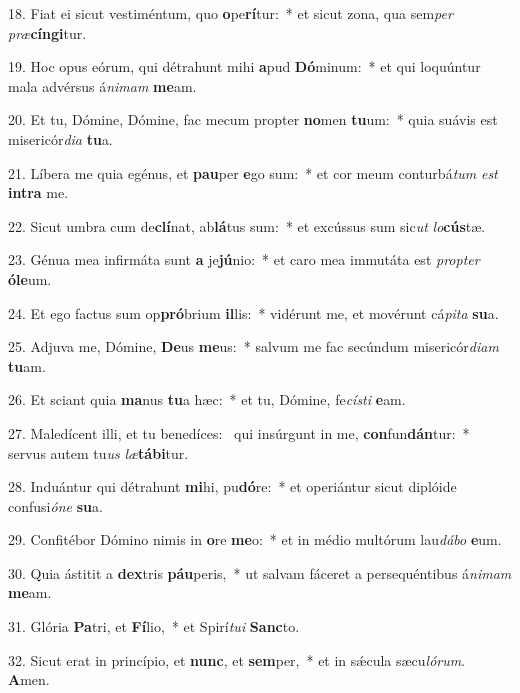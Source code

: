 18. Fiat ei sicut vestiméntum, quo \textbf{o}pe\textbf{rí}tur:~*  et sicut zona, qua sem\textit{per} \textit{præ}\textbf{cín}\textbf{gi}tur.\

19. Hoc opus eórum, qui détrahunt mihi \textbf{a}pud \textbf{Dó}minum:~*  et qui loquúntur mala advérsus á\textit{ni}\textit{mam} \textbf{me}am.\

20. Et tu, Dómine, Dómine, fac mecum propter \textbf{no}men \textbf{tu}um:~*  quia suávis est misericór\textit{di}\textit{a} \textbf{tu}a.\

21. Líbera me quia egénus, et \textbf{pau}per \textbf{e}go sum:~*  et cor meum conturbá\textit{tum} \textit{est} \textbf{in}\textbf{tra} me.\

22. Sicut umbra cum de\textbf{clí}nat, ab\textbf{lá}tus sum:~*  et excússus sum sic\textit{ut} \textit{lo}\textbf{cús}tæ.\

23. Génua mea infirmáta sunt \textbf{a} je\textbf{jú}nio:~*  et caro mea immutáta est \textit{prop}\textit{ter} \textbf{ó}\textbf{le}um.\

24. Et ego factus sum op\textbf{pró}brium \textbf{il}lis:~*  vidérunt me, et movérunt cá\textit{pi}\textit{ta} \textbf{su}a.\

25. Adjuva me, Dómine, \textbf{De}us \textbf{me}us:~*  salvum me fac secúndum misericór\textit{di}\textit{am} \textbf{tu}am.\

26. Et sciant quia \textbf{ma}nus \textbf{tu}a hæc:~*  et tu, Dómine, fe\textit{cís}\textit{ti} \textbf{e}am.\

27. Maledícent illi, et tu benedíces: \dag\  qui insúrgunt in me, \textbf{con}fun\textbf{dán}tur:~*  servus autem tu\textit{us} \textit{læ}\textbf{tá}\textbf{bi}tur.\

28. Induántur qui détrahunt \textbf{mi}hi, pu\textbf{dó}re:~*  et operiántur sicut diplóide confusi\textit{ó}\textit{ne} \textbf{su}a.\

29. Confitébor Dómino nimis in \textbf{o}re \textbf{me}o:~*  et in médio multórum lau\textit{dá}\textit{bo} \textbf{e}um.\

30. Quia ástitit a \textbf{dex}tris \textbf{páu}peris,~*  ut salvam fáceret a persequéntibus á\textit{ni}\textit{mam} \textbf{me}am.\

31. Glória \textbf{Pa}tri, et \textbf{Fí}lio,~*  et Spirí\textit{tu}\textit{i} \textbf{Sanc}to.\

32. Sicut erat in princípio, et \textbf{nunc}, et \textbf{sem}per,~*  et in sǽcula sæcu\textit{ló}\textit{rum}. \textbf{A}men.\

